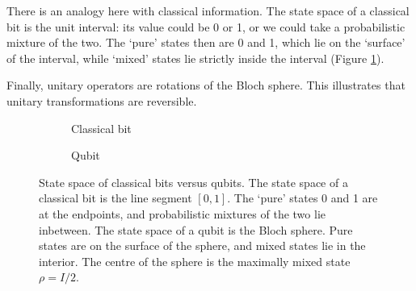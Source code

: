 \documentclass{article}
\makeatletter
\renewcommand\bra[1]{{\langle{#1}|}}
\renewcommand\ket[1]{
  \@ifnextchar\bra{\k@t{#1}\!}{\k@t{#1}}
}
\renewcommand\ket[1]{
  \@ifnextchar\braket{\k@t{#1}\!}{\k@t{#1}}
}
\newcommand\k@t[1]{{|{#1}\rangle}}
\theoremstyle{definition}
\makeatother
\begin{document}
There is an analogy here with classical information. The state space of a classical bit is the unit interval: its value could be 0 or 1, or we could take a probabilistic mixture of the two. The `pure' states then are 0 and 1, which lie on the `surface' of the interval, while `mixed' states lie strictly inside the interval (Figure \ref{fig:cbit_state_space}). 


Finally, unitary operators are rotations of the Bloch sphere. This illustrates that unitary transformations are reversible.

\begin{figure}
\centering
\begin{subfigure}{0.25\linewidth}
\centering
{}
\caption{Classical bit}
\label{fig:cbit_state_space}
\end{subfigure}%
\begin{subfigure}{0.75\linewidth}
\centering
{}
\caption{Qubit}
\label{fig:qubit_state_space}
\end{subfigure}

\caption{State space of classical bits versus qubits. The state space of a classical bit is the line segment $[0,1]$. The `pure' states 0 and 1 are at the endpoints, and probabilistic mixtures of the two lie inbetween. The state space of a qubit is the Bloch sphere. Pure states are on the surface of the sphere, and mixed states lie in the interior. The centre of the sphere is the maximally mixed state $\rho=I/2$.}
\end{figure}
\end{document}
